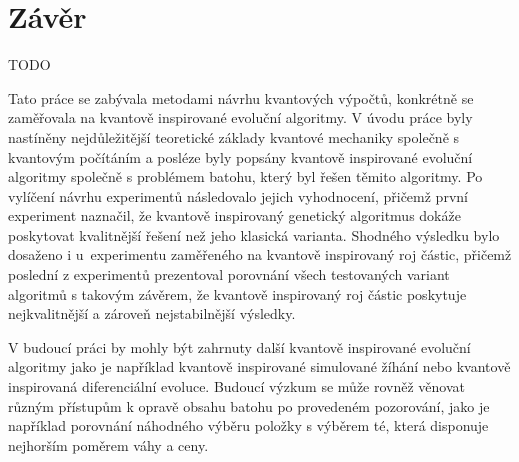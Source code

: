 \chapter{Závěr}
TODO

Tato práce se zabývala metodami návrhu kvantových výpočtů, konkrétně se zaměřovala na kvantově inspirované evoluční algoritmy. 
V úvodu práce byly nastíněny nejdůležitější teoretické základy kvantové mechaniky společně s kvantovým počítáním a posléze byly popsány kvantově inspirované evoluční algoritmy společně s problémem batohu, který byl řešen těmito algoritmy. 
Po vylíčení návrhu experimentů následovalo jejich vyhodnocení, přičemž první experiment naznačil, že kvantově inspirovaný genetický algoritmus dokáže poskytovat kvalitnější řešení než jeho klasická varianta. 
Shodného výsledku bylo dosaženo i u~experimentu zaměřeného na kvantově inspirovaný roj částic, přičemž poslední z experimentů prezentoval porovnání všech testovaných variant algoritmů s takovým závěrem, že kvantově inspirovaný roj částic poskytuje nejkvalitnější a zároveň nejstabilnější výsledky. 

V budoucí práci by mohly být zahrnuty další kvantově inspirované evoluční algoritmy jako je například kvantově inspirované simulované žíhání nebo kvantově inspirovaná diferenciální evoluce. 
Budoucí výzkum se může rovněž věnovat různým přístupům k opravě obsahu batohu po provedeném pozorování, jako je například porovnání náhodného výběru položky s výběrem té, která disponuje nejhorším poměrem váhy a ceny. 
